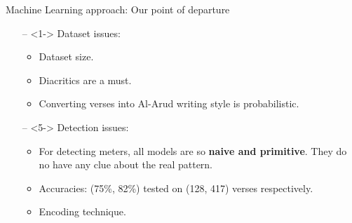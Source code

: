 \begin{frame}[fragile]{Machine Learning approach: Our point of departure}
\begin{itemize}
\item[--]<1-> Dataset issues:
\begin{itemize}
\item<2-> Dataset size.
\item<3-> Diacritics are a must.
\item<4-> Converting verses into Al-Arud writing style is probabilistic.
\end{itemize}

\item[--]<5-> Detection issues:

	\begin{itemize}
	\item<6-> For detecting meters, all models are so \textbf{naive and primitive}. They do no have any clue about the real pattern.
	\item<7-> Accuracies: (75\%, 82\%) tested on (128, 417) verses respectively.
	
	
	\item<8-> Encoding technique.
	\end{itemize}
\end{itemize}
\end{frame}

